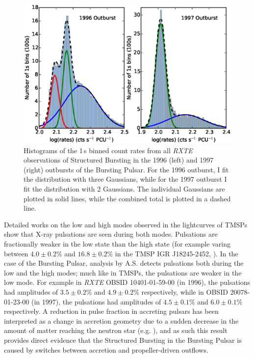 \begin{figure}
 \centering
 \includegraphics[width=.82\linewidth, trim={1.3cm 0.1cm 1.7cm 1.1cm},clip]{images/hist_bo.eps}
 \caption[Histograms of the 1\,s binned count rates from all \textit{RXTE} observations of Structured Bursting in the 1996 and 1997 outbursts of the Bursting Pulsar.]{Histograms of the 1\,s binned count rates from all \indexrxte\textit{RXTE} observations of Structured Bursting in the 1996 (left) and 1997 (right) outbursts of the Bursting Pulsar. For the 1996 outburst, I fit the distribution with three Gaussians, while for the 1997 outburst I fit the distribution with 2 Gaussians. The individual Gaussians are plotted in solid lines, while the combined total is plotted in a dashed line.}
 \label{fig:bimodal}
\end{figure}

\par Detailed works on the low and high modes observed in the lightcurves of TMSPs show that X-ray pulsations are seen during both modes. Pulsations are fractionally weaker in the low state than the high state (for example varing between $4.0\pm0.2\%$ and $16.8\pm0.2\%$ in the TMSP IGR J18245-2452, \citealp{Ferrigno_TMSPVar}). In the case of the Bursting Pulsar, analysis by \textsf{A.S.} detects pulsations both during the low and the high modes; much like in TMSPs, the pulsations are weaker in the low mode. For example in \indexrxte\textit{RXTE} OBSID 10401-01-59-00 (in 1996), the pulsations had amplitudes of $3.5\pm0.2\%$ and $4.9\pm0.2\%$ respectively, while in OBSID 20078-01-23-00 (in 1997), the pulsations had amplitudes of $4.5\pm0.1\%$ and $6.0\pm0.1\%$ respectively. A reduction in pulse fraction in accreting pulsars has been interpreted as a change in accretion geometry due to a sudden decrease in the amount of matter reaching the neutron star (e.g. \citealp{Ibragimov_PulseFrac}), and as such this result provides direct evidence that the Structured Bursting in the Bursting Pulsar is caused by switches between accretion and propeller-driven outflows.

